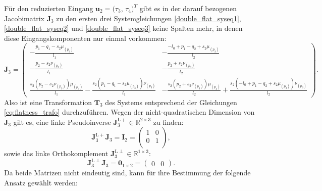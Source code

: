 Für den reduzierten Eingang $ \mathbf{u}_2 = (\tau_3$, $\tau_4)^T$ gibt es in der darauf bezogenen Jacobimatrix $\mathbf{J}_3$ zu den ersten drei Systemgleichungen  \eqref{double_flat_syseq1}, \eqref{double_flat_syseq2} und \eqref{double_flat_syseq3} keine Spalten mehr, in denen diese Eingangskomponenten nur einmal vorkommen:
\begin{equation*}
	\mathbf{J}_3 =
	\left(\begin{smallmatrix}
	- \frac{p_{1} - q_{1} - s_{2} \mu_{\left(p_{3} \right)}}{l_{1}} & - \frac{- l_{0} + p_{1} - q_{2} + s_{2} \mu_{\left(p_{3} \right)}}{l_{2}}\\
	- \frac{p_{2} - s_{2} \nu_{\left(p_{3} \right)}}{l_{1}} & - \frac{p_{2} + s_{2} \nu_{\left(p_{3} \right)}}{l_{2}}\\
	\frac{s_{2} \left(p_{2} - s_{2} \nu_{\left(p_{3} \right)}\right) \mu_{\left(p_{3} \right)}}{l_{1}} - \frac{s_{2} \left(p_{1} - q_{1} - s_{2} \mu_{\left(p_{3} \right)}\right) \nu_{\left(p_{3} \right)}}{l_{1}} & - \frac{s_{2} \left(p_{2} + s_{2} \nu_{\left(p_{3} \right)}\right) \mu_{\left(p_{3} \right)}}{l_{2}} + \frac{s_{2} \left(- l_{0} + p_{1} - q_{2} + s_{2} \mu_{\left(p_{3} \right)}\right) \nu_{\left(p_{3} \right)}}{l_{2}}
	\end{smallmatrix}\right).
\end{equation*}
Also ist eine Transformation $\mathbf{T}_3$ des Systems entsprechend der Gleichungen \eqref{eq:flatness_trafo} durchzuführen. Wegen der nicht-quadratischen Dimension von $\mathbf{J}_3$ gilt es, eine linke Pseudoinverse $\mathbf{J}_3^{\mathrm{L}+} \in \mathbb{R}^{2 \times 3}$ zu finden:
\begin{equation}
	\mathbf{J}_3^{\mathrm{L}+} \mathbf{J}_3 = \mathbf{I}_{2} = 
	\left(\begin{matrix}
	1 & 0\\
	0 & 1\\
	\end{matrix}\right),
\end{equation}
sowie das linke Orthokomplement $\mathbf{J}_3^{\mathrm{L}\perp} \in \mathbb{R}^{1 \times 3}$:
\begin{equation}
	\mathbf{J}_3^{\mathrm{L}\perp} \mathbf{J}_3 = \mathbf{0}_{1 \times 2} = 
	\left(\begin{matrix}
	0 & 0
	\end{matrix}\right).
\end{equation}
Da beide Matrizen nicht eindeutig sind, kann für ihre Bestimmung der folgende Ansatz gewählt werden: 
